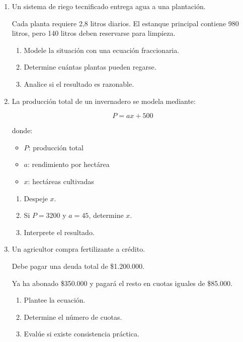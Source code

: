 \documentclass[11pt]{article}
\begin{document}
	\begin{enumerate}[label=\textbf{\arabic*.}, start=12]
		
		\item Un sistema de riego tecnificado entrega agua a una plantación.
		
		Cada planta requiere 2,8 litros diarios.
		El estanque principal contiene 980 litros,
		pero 140 litros deben reservarse para limpieza.
		
		\begin{enumerate}[label=\alph*)]
			\item Modele la situación con una ecuación fraccionaria.
			\item Determine cuántas plantas pueden regarse.
			\item Analice si el resultado es razonable.
		\end{enumerate}
		
		
		\item La producción total de un invernadero se modela mediante:
		
		\[
		P = ax + 500
		\]
		
		donde:
		
		\begin{itemize}
			\item \(P\): producción total
			\item \(a\): rendimiento por hectárea
			\item \(x\): hectáreas cultivadas
		\end{itemize}
		
		\begin{enumerate}[label=\alph*)]
			\item Despeje \(x\).
			\item Si \(P=3200\) y \(a=45\), determine \(x\).
			\item Interprete el resultado.
		\end{enumerate}
		
		
		\item Un agricultor compra fertilizante a crédito.
		
		Debe pagar una deuda total de \$1.200.000.
		
		Ya ha abonado \$350.000 y pagará
		el resto en cuotas iguales de \$85.000.
		
		\begin{enumerate}[label=\alph*)]
			\item Plantee la ecuación.
			\item Determine el número de cuotas.
			\item Evalúe si existe consistencia práctica.
		\end{enumerate}
		
	\end{enumerate}
	
\end{document}
